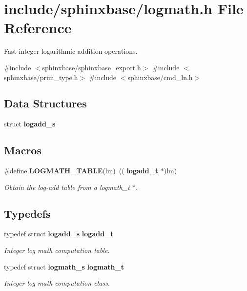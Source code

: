 \section{include/sphinxbase/logmath.h File Reference}
\label{logmath_8h}


Fast integer logarithmic addition operations.  


{\ttfamily \#include $<$sphinxbase/sphinxbase\+\_\+export.\+h$>$}\newline
{\ttfamily \#include $<$sphinxbase/prim\+\_\+type.\+h$>$}\newline
{\ttfamily \#include $<$sphinxbase/cmd\+\_\+ln.\+h$>$}\newline
\subsection*{Data Structures}
\begin{DoxyCompactItemize}
\item 
struct \textbf{ logadd\+\_\+s}
\end{DoxyCompactItemize}
\subsection*{Macros}
\begin{DoxyCompactItemize}
\item 
\mbox{\label{logmath_8h_ae5c5ce106e9f8f1e763d419de53317a8}} 
\#define \textbf{ L\+O\+G\+M\+A\+T\+H\+\_\+\+T\+A\+B\+LE}(lm)~((\textbf{ logadd\+\_\+t} $\ast$)lm)
\begin{DoxyCompactList}\small\item\em Obtain the log-\/add table from a logmath\+\_\+t $\ast$. \end{DoxyCompactList}\end{DoxyCompactItemize}
\subsection*{Typedefs}
\begin{DoxyCompactItemize}
\item 
typedef struct \textbf{ logadd\+\_\+s} \textbf{ logadd\+\_\+t}
\begin{DoxyCompactList}\small\item\em Integer log math computation table. \end{DoxyCompactList}\item 
\mbox{\label{logmath_8h_ae613aa7db1dd40ff56a80a7dadb22cc8}} 
typedef struct \textbf{ logmath\+\_\+s} \textbf{ logmath\+\_\+t}
\begin{DoxyCompactList}\small\item\em Integer log math computation class. \end{DoxyCompactList}\end{DoxyCompactItemize}
